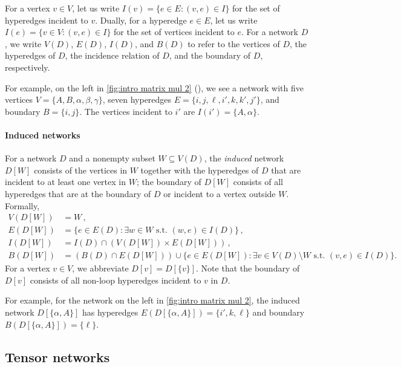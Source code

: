 For a vertex $v\in V$, let us write $I(v)=\{e\in E:(v,e)\in I\}$
for the set of hyperedges incident to $v$. Dually, for a hyperedge $e\in E$, let
us write $I(e)=\{v\in V:(v,e)\in I\}$ for the set of vertices incident to $e$.
For a network $D$, we write $V(D)$, $E(D)$, $I(D)$, and $B(D)$ to
refer to the vertices of $D$, the hyperedges of $D$, the incidence relation
of $D$, and the boundary of $D$, respectively.

For example, on the left in \eqref{fig:intro matrix mul 2} (),
we see a network with five vertices $V = \{A, B, \alpha, \beta, \gamma\}$,
seven hyperedges $E = \{i, j, \ell, i', k, k', j'\}$, and boundary $B =
\{i, j\}$.  The vertices incident to $i'$ are $I(i') = \{A, \alpha\}$.

\paragraph*{Induced networks}
For a network $D$ and a nonempty subset $W\subseteq V(D)$,
the \emph{induced} network $D[W]$ consists of the vertices in $W$ together with the hyperedges of
$D$ that are incident to at least one vertex in $W$; the boundary of
$D[W]$ consists of all hyperedges that are at the boundary of $D$
or incident to a vertex outside $W$.  Formally,
\begin{equation}
\label{eq:induced}
\begin{aligned}
  V(D[W])&=W\,,\\
  E(D[W])&=\{e\in E(D):\text{$\exists w \in W$ s.t.~$(w,e)\in I(D)$}\}\,,\\
  I(D[W])&=I(D)\cap\left(V(D[W])\times E(D[W])\right)\,,\\
  B(D[W])&=\left(B(D)\cap E(D[W])\right)\cup
  \{e\in E(D[W])\!:\text{$\exists v \in V(D) \!\setminus\! W$ s.t.~$(v,e)\in I(D)$}\}.
\end{aligned}
\end{equation}
For a vertex $v\in V$, we abbreviate $D[v]=D[\{v\}]$.
Note that the boundary of $D[v]$ consists of all non-loop
hyperedges incident to $v$ in $D$.

For example, for the network on the left in \eqref{fig:intro matrix
  mul 2}, the induced network $D[\{\alpha, A\}]$ has hyperedges $E(D[\{\alpha, A\}]) = \{i',k, \ell\}$ and boundary $B(D[\{\alpha,A\}]) = \{\ell\}$.

\subsection{Tensor networks}


